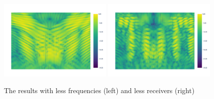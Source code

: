 \begin{figure}[h]
    \centering
    \includegraphics[page=1, width=0.49\textwidth]{figures/multipath_nlos_reduced_freq.pdf}
    \includegraphics[page=1, width=0.49\textwidth]{figures/multipath_nlos_reduced_receiver.pdf}
    \caption{The results with less frequencies (left) and less receivers (right)}\label{fig:MultipathNLOS_time_optimized}
\end{figure}

